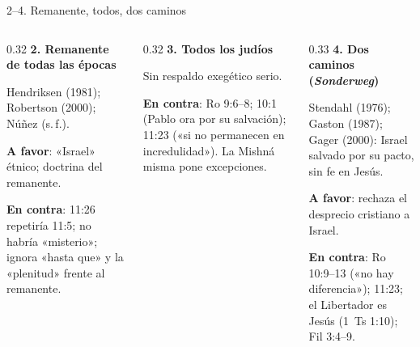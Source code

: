 \begin{frame}{2--4. Remanente, todos, dos caminos}
\begin{columns}[T,onlytextwidth]
\begin{column}{0.32\textwidth}\scriptsize\RaggedRight
\textbf{\textcolor{ladrillo}{2. Remanente de todas las épocas}}\par\smallskip
Hendriksen (1981); Robertson (2000); Núñez (s.\,f.).\par\smallskip
\textbf{A favor}: «Israel» étnico; doctrina del remanente.\par
\textbf{En contra}: 11:26 repetiría 11:5; no habría «misterio»; ignora «hasta que» y la «plenitud» frente al remanente.
\end{column}
\begin{column}{0.32\textwidth}\scriptsize\RaggedRight
\textbf{\textcolor{ladrillo}{3. Todos los judíos}}\par\smallskip
Sin respaldo exegético serio.\par\smallskip
\textbf{En contra}: Ro 9:6--8; 10:1 (Pablo ora por su salvación); 11:23 («si no permanecen en incredulidad»). La Mishná misma pone excepciones.
\end{column}
\begin{column}{0.33\textwidth}\scriptsize\RaggedRight
\textbf{\textcolor{ladrillo}{4. Dos caminos (\emph{Sonderweg})}}\par\smallskip
Stendahl (1976); Gaston (1987); Gager (2000): Israel salvado por su pacto, sin fe en Jesús.\par\smallskip
\textbf{A favor}: rechaza el desprecio cristiano a Israel.\par
\textbf{En contra}: Ro 10:9--13 («no hay diferencia»); 11:23; el Libertador es Jesús (1~Ts 1:10); Fil 3:4--9.
\end{column}
\end{columns}
\end{frame}

